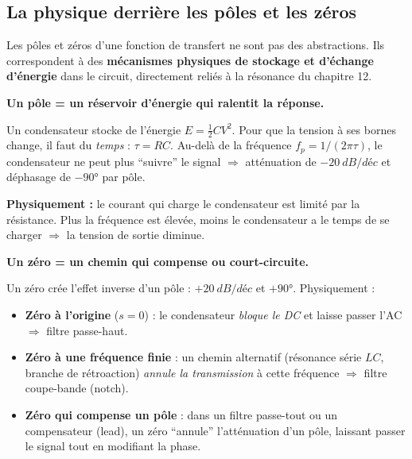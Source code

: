 \documentclass[12pt,a4paper,twoside]{book}
\begin{document}
\subsection{La physique derrière les pôles et les zéros}

Les pôles et zéros d'une fonction de transfert ne sont pas des abstractions. Ils correspondent à des \textbf{mécanismes physiques de stockage et d'échange d'énergie} dans le circuit, directement reliés à la résonance du chapitre 12.

\begin{formule}
\textbf{Un pôle = un réservoir d'énergie qui ralentit la réponse.}

Un condensateur stocke de l'énergie $E = \frac{1}{2}CV^2$. Pour que la tension à ses bornes change, il faut du \textit{temps} : $\tau = RC$. Au-delà de la fréquence $f_p = 1/(2\pi\tau)$, le condensateur ne peut plus ``suivre'' le signal $\Rightarrow$ atténuation de $-\SI{20}{dB/déc}$ et déphasage de $-90°$ par pôle.

\textbf{Physiquement :} le courant qui charge le condensateur est limité par la résistance. Plus la fréquence est élevée, moins le condensateur a le temps de se charger $\Rightarrow$ la tension de sortie diminue.
\end{formule}

\begin{formule}
\textbf{Un zéro = un chemin qui compense ou court-circuite.}

Un zéro crée l'effet inverse d'un pôle : $+\SI{20}{dB/déc}$ et $+90°$. Physiquement :
\begin{itemize}[nosep]
\item \textbf{Zéro à l'origine} ($s=0$) : le condensateur \textit{bloque le DC} et laisse passer l'AC $\Rightarrow$ filtre passe-haut.
\item \textbf{Zéro à une fréquence finie} : un chemin alternatif (résonance série $LC$, branche de rétroaction) \textit{annule la transmission} à cette fréquence $\Rightarrow$ filtre coupe-bande (notch).
\item \textbf{Zéro qui compense un pôle} : dans un filtre passe-tout ou un compensateur (lead), un zéro ``annule'' l'atténuation d'un pôle, laissant passer le signal tout en modifiant la phase.
\end{itemize}
\end{formule}
\end{document}
